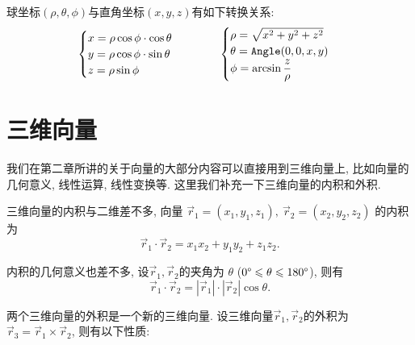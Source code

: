 球坐标$(\rho,\theta,\phi)$与直角坐标$(x,y,z)$有如下转换关系:
\[
  \begin{cases}
    x = \rho\cos\phi \cdot \cos\theta \\
    y = \rho\cos\phi \cdot \sin\theta \\
    z = \rho\sin\phi
  \end{cases}\quad\quad\quad
  \begin{cases}
    \rho = \sqrt{x^2+y^2+z^2} \\
    \theta = \texttt{Angle}(0,0,x,y)  \\
    \phi = \arcsin\dfrac{z}{\rho}
  \end{cases}
\]

\section{三维向量}

我们在第二章所讲的关于向量的大部分内容可以直接用到三维向量上,
比如向量的几何意义, 线性运算, 线性变换等.
这里我们补充一下三维向量的内积和外积.

三维向量的内积与二维差不多, 向量
$\vec r_1=(x_1,y_1,z_1),\ \vec r_2=(x_2,y_2,z_2)$
的内积为
\[
  \vec r_1 \cdot \vec r_2 = x_1x_2 + y_1y_2 + z_1z_2.
\]

内积的几何意义也差不多, 设$\vec r_1,\vec r_2$的夹角为
$\theta$ ($0\degree \leqslant \theta \leqslant 180\degree$), 则有
\[
  \vec r_1 \cdot \vec r_2 = |\vec r_1|\cdot|\vec r_2| \cos\theta.
\]

两个三维向量的外积是一个新的三维向量.
设三维向量$\vec r_1,\vec r_2$的外积为
$\vec r_3 = \vec r_1\times\vec r_2$,
则有以下性质:

